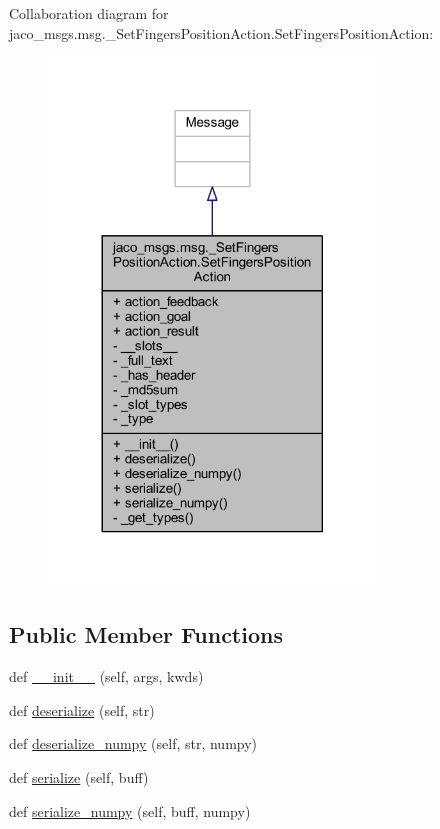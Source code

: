 Collaboration diagram for jaco\+\_\+msgs.\+msg.\+\_\+\+Set\+Fingers\+Position\+Action.\+Set\+Fingers\+Position\+Action\+:
\nopagebreak
\begin{figure}[H]
\begin{center}
\leavevmode
\includegraphics[width=245pt]{d6/d03/classjaco__msgs_1_1msg_1_1__SetFingersPositionAction_1_1SetFingersPositionAction__coll__graph}
\end{center}
\end{figure}
\subsection*{Public Member Functions}
\begin{DoxyCompactItemize}
\item 
def \hyperlink{classjaco__msgs_1_1msg_1_1__SetFingersPositionAction_1_1SetFingersPositionAction_a72205316d6d901b54f379797e31fe131}{\+\_\+\+\_\+init\+\_\+\+\_\+} (self, args, kwds)
\item 
def \hyperlink{classjaco__msgs_1_1msg_1_1__SetFingersPositionAction_1_1SetFingersPositionAction_a912dc69b416f4d6dfea87d3d2f60627a}{deserialize} (self, str)
\item 
def \hyperlink{classjaco__msgs_1_1msg_1_1__SetFingersPositionAction_1_1SetFingersPositionAction_a1a86f1b2ee136f427a5d62d3f2982af9}{deserialize\+\_\+numpy} (self, str, numpy)
\item 
def \hyperlink{classjaco__msgs_1_1msg_1_1__SetFingersPositionAction_1_1SetFingersPositionAction_a2e8ac18e59483a94b53109eb9c0b022e}{serialize} (self, buff)
\item 
def \hyperlink{classjaco__msgs_1_1msg_1_1__SetFingersPositionAction_1_1SetFingersPositionAction_aa1fa7fa0fb7bfa49ee98b481617e860c}{serialize\+\_\+numpy} (self, buff, numpy)
\end{DoxyCompactItemize}
